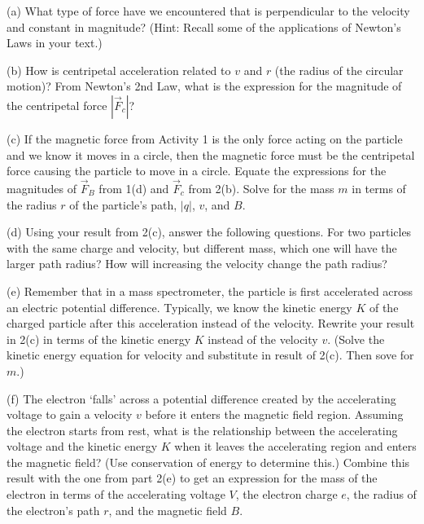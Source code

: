 (a) What type of force have we encountered 
that is perpendicular to the velocity and constant in magnitude?
(Hint: Recall some of the applications of Newton's Laws in your text.)
\vspace{15mm}

(b) How is centripetal acceleration related to $v$ and $r$ (the radius of the
circular motion)? From Newton's 2nd Law, what is the expression for the magnitude of the centripetal force $|\vec F_c|$?
\vspace{15mm}

\newpage

(c) If the magnetic force from Activity 1 is the only force acting on the particle and we know it moves in a circle, then the magnetic force must be the centripetal force causing the particle to move in a circle. Equate the expressions for the magnitudes of $\vec F_B$ from 1(d) and
$\vec F_c$ from 2(b).
Solve for the mass $m$ in terms of the radius $r$ of the particle's path,
$|q|$, $v$, and $B$.
\vspace{35mm}


(d) Using your result from 2(c), answer the following questions.
For two particles with the same charge and velocity, but different mass, which one will have the larger path radius?
How will increasing the velocity change the path radius?
\vspace{30mm}

(e) Remember that in a mass spectrometer, the particle is first accelerated
across an electric potential difference. Typically, we know the kinetic 
energy $K$ of the charged particle after this acceleration instead of the 
velocity. Rewrite your result in 2(c) in terms of the kinetic energy $K$ 
instead of the velocity $v$. (Solve the kinetic energy equation for velocity 
and substitute in result of 2(c). Then sove for $m$.)
\vspace{30mm}

(f) The electron `falls' across a potential difference created by the 
accelerating voltage to gain a velocity $v$ before it enters the magnetic 
field region. Assuming the electron starts from rest, what is the relationship 
between the accelerating voltage and the kinetic energy $K$ when it leaves the 
accelerating region and enters the magnetic field? (Use conservation of energy 
to determine this.) Combine this result with the one from part 2(e) to get an 
expression for the mass of the electron in terms of the accelerating voltage 
$V$, the electron charge $e$, the radius of the electron's path $r$, and the 
magnetic field $B$.
\vspace{30mm}

